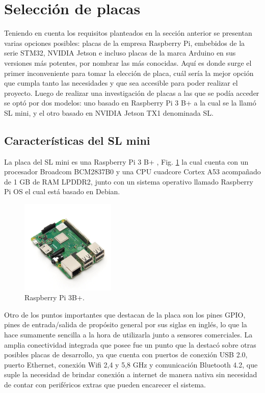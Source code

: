 \section{Selección de placas}

Teniendo en cuenta los requisitos planteados en la sección anterior se presentan varias opciones posibles:
placas de la empresa Raspberry Pi, embebidos de la serie STM32, NVIDIA Jetson e incluso placas de la marca Arduino en sus versiones más potentes, por nombrar las más conocidas.
Aquí es donde surge el primer inconveniente para tomar la elección de placa,
cuál sería la mejor opción que cumpla tanto las necesidades y que sea accesible para poder realizar el proyecto.
Luego de realizar una investigación de placas a las que se podía acceder se optó por dos modelos: uno basado en Raspberry Pi 3 B+ a la cual se la llamó SL mini, y el otro basado en NVIDIA Jetson TX1 denominada SL.

\subsection{Características del SL mini}

La placa del SL mini es una Raspberry Pi 3 B+ \cite{noauthor_documentacion_nodate-2}, Fig. \ref{fig:raspberry} la cual cuenta con un procesador
Broadcom BCM2837B0 y  una CPU cuadcore Cortex A53 acompañado de 1 GB de RAM LPDDR2, junto con un sistema operativo llamado Raspberry Pi OS el cual está basado en Debian.

\begin{figure}[bth]
    \centering
    \includegraphics[width=0.4\textwidth]{imgs/Raspberry-pi3b+.jpg}
    \caption{Raspberry Pi 3B+.}
    \label{fig:raspberry}
\end{figure}

Otro de los puntos importantes que destacan de la placa son los pines GPIO, pines de entrada/salida de propósito general por sus siglas en inglés, lo que la hace sumamente sencilla a la hora de utilizarla junto a sensores comerciales.
La amplia conectividad integrada que posee fue un punto que la destacó sobre otras posibles placas de desarrollo, ya que cuenta con puertos de conexión USB 2.0, puerto Ethernet, conexión Wifi 2,4 y 5,8 GHz y comunicación Bluetooth 4.2, que suple la necesidad de brindar conexión a internet de manera nativa sin necesidad de contar con periféricos extras que pueden encarecer el sistema.

